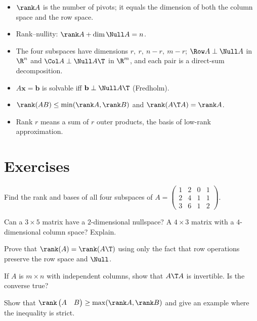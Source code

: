\begin{summarybox}
\begin{itemize}
  \item $\rank A$ is the number of pivots; it equals the dimension of both the column space and the row space.
  \item Rank--nullity: $\rank A+\dim\Null A=n$.
  \item The four subspaces have dimensions $r,\ r,\ n-r,\ m-r$; $\Row A\perp\Null A$ in $\R^n$ and $\Col A\perp\Null A\T$ in $\R^m$, and each pair is a direct-sum decomposition.
  \item $A\mathbf{x}=\mathbf{b}$ is solvable iff $\mathbf{b}\perp\Null A\T$ (Fredholm).
  \item $\rank(AB)\le\min(\rank A,\rank B)$ and $\rank(A\T A)=\rank A$.
  \item Rank $r$ means a sum of $r$ outer products, the basis of low-rank approximation.
\end{itemize}
\end{summarybox}

\section{Exercises}

\begin{exercise}
Find the rank and bases of all four subspaces of $A=\begin{pmatrix}1&2&0&1\\2&4&1&1\\3&6&1&2\end{pmatrix}$.
\end{exercise}

\begin{exercise}
Can a $3\times 5$ matrix have a $2$-dimensional nullspace? A $4\times 3$ matrix with a $4$-dimensional column space? Explain.
\end{exercise}

\begin{exercise}
Prove that $\rank(A)=\rank(A\T)$ using only the fact that row operations preserve the row space and $\Null$.
\end{exercise}

\begin{exercise}
If $A$ is $m\times n$ with independent columns, show that $A\T A$ is invertible. Is the converse true?
\end{exercise}

\begin{exercise}
Show that $\rank\begin{pmatrix}A&B\end{pmatrix}\ge\max(\rank A,\rank B)$ and give an example where the inequality is strict.
\end{exercise}

